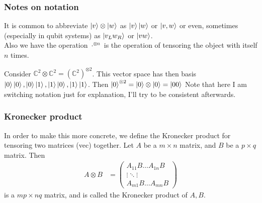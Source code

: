 \documentclass{beamer}
\begin{document}
    \begin{frame}
        \frametitle{Notes on notation}
        It is common to abbreviate $\ket{v} \otimes \ket{w}$ as $\ket{v}\ket{w}$ or $\ket{v, w}$ or even,
        sometimes (especially in qubit systems) as $\ket{v_L w_R}$ or $\ket{v w}$. \\
        Also we have the operation $\cdot^{\otimes n}$ is the operation of tensoring the object with itself $n$ times.
        \begin{example}
            Consider  $\mathbb{C}^2 \otimes \mathbb{C}^2 = (\mathbb{C}^2)^{\otimes 2}$. 
            This vector space has then basis $\ket{0}\ket{0}, \ket{0}\ket{1}, \ket{1}\ket{0}, \ket{1}\ket{1}$.
            Then $\ket{0}^{\otimes 2} = \ket{0} \otimes \ket{0} = \ket{00}$
            Note that here I am switching notation just for explanation, I'll try to be consistent afterwards.
        \end{example}
        

    
    \end{frame}
    \begin{frame}
        \frametitle{Kronecker product}
        In order to make this more concrete, we define the Kronecker product for tensoring two matrices (vec) together.
        Let $A$ be a $m \times n$ matrix, and $B$ be a $p \times q$ matrix. Then
        \begin{align}
            A \otimes B &= \begin{pmatrix}
                A_{11} B \dots A_{1n} B \\
                \vdots \ddots \vdots  \\
                A_{m1} B \dots A_{mn} B
            \end{pmatrix}
        \end{align}
        is a $mp \times nq$ matrix, and is called the Kronecker product of $A, B$.
    
    \end{frame}
\end{document}
